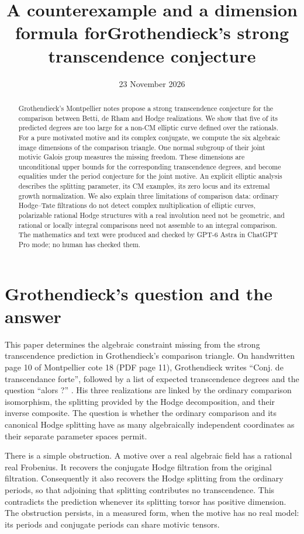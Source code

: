 \documentclass[11pt]{article}
\title{A counterexample and a dimension formula for\newline Grothendieck's strong transcendence conjecture}
\author{}
\date{23 November 2026}
\theoremstyle{definition}\newtheorem{definition}[theorem]{Definition}
\theoremstyle{remark}\newtheorem{remark}[theorem]{Remark}
\begin{document}
\maketitle
\begin{abstract}
Grothendieck's Montpellier notes propose a strong transcendence conjecture for the comparison between Betti, de Rham and Hodge realizations. We show that five of its predicted degrees are too large for a non-CM elliptic curve defined over the rationals. For a pure motivated motive and its complex conjugate, we compute the six algebraic image dimensions of the comparison triangle. One normal subgroup of their joint motivic Galois group measures the missing freedom. These dimensions are unconditional upper bounds for the corresponding transcendence degrees, and become equalities under the period conjecture for the joint motive. An explicit elliptic analysis describes the splitting parameter, its CM examples, its zero locus and its extremal growth normalization. We also explain three limitations of comparison data: ordinary Hodge--Tate filtrations do not detect complex multiplication of elliptic curves, polarizable rational Hodge structures with a real involution need not be geometric, and rational or locally integral comparisons need not assemble to an integral comparison. The mathematics and text were produced and checked by GPT-6 Astra in ChatGPT Pro mode; no human has checked them.
\end{abstract}

\section{Grothendieck's question and the answer}

This paper determines the algebraic constraint missing from the strong transcendence prediction in Grothendieck's comparison triangle. On handwritten page 10 of Montpellier cote 18 (PDF page 11), Grothendieck writes ``Conj. de transcendance forte'', followed by a list of expected transcendence degrees and the question ``alors ?'' \cite[p.~10; PDF p.~11]{Grothendieck}. His three realizations are linked by the ordinary comparison isomorphism, the splitting provided by the Hodge decomposition, and their inverse composite. The question is whether the ordinary comparison and its canonical Hodge splitting have as many algebraically independent coordinates as their separate parameter spaces permit.

There is a simple obstruction. A motive over a real algebraic field has a rational real Frobenius. It recovers the conjugate Hodge filtration from the original filtration. Consequently it also recovers the Hodge splitting from the ordinary periods, so that adjoining that splitting contributes no transcendence. This contradicts the prediction whenever its splitting torsor has positive dimension. The obstruction persists, in a measured form, when the motive has no real model: its periods and conjugate periods can share motivic tensors.
\end{document}

